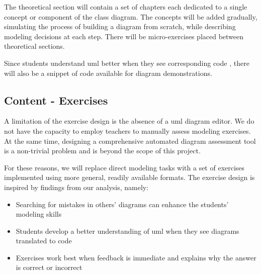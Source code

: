 The theoretical section will contain a set of chapters each dedicated to a single concept or component of the class diagram. The concepts will be added gradually, simulating the process of building a diagram from scratch, while describing modeling decisions at each step. There will be micro-exercises placed between theoretical sections.

Since students understand \ac{uml} better when they see corresponding code \cite{umple}, there will also be a snippet of code available for diagram demonstrations. 



\subsection{Content - Exercises} 

A limitation of the exercise design is the absence of a \ac{uml} diagram editor. We do not have the capacity to employ teachers to manually assess modeling exercises. At the same time, designing a comprehensive automated diagram assessment tool is a non-trivial problem and is beyond the scope of this project.

For these reasons, we will replace direct modeling tasks with a set of exercises implemented using more general, readily available formats. The exercise design is inspired by findings from our analysis, namely:

\begin{itemize}
    \item Searching for mistakes in others' diagrams can enhance the students' modeling skills \cite{shmallo2020constructive}
    \item Students develop a better understanding of \ac{uml} when they see diagrams translated to code \cite{umple}
    \item Exercises work best when feedback is immediate and explains why the answer is correct or incorrect \cite{al2022effect}
\end{itemize}

